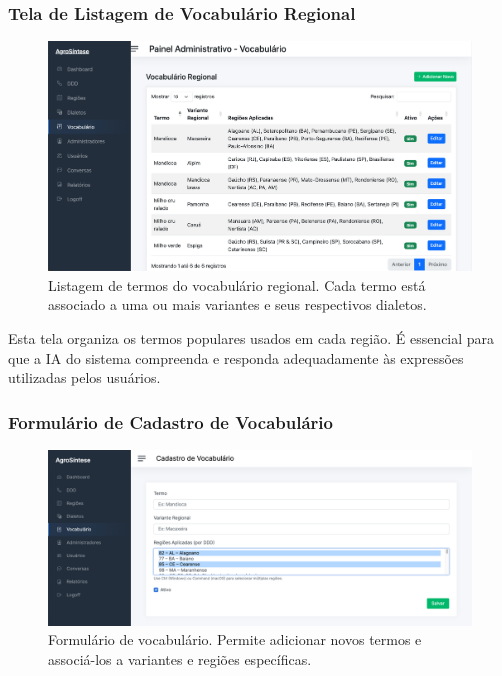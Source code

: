 \subsubsection*{Tela de Listagem de Vocabulário Regional}

\begin{figure}[H]
	\centering
	\includegraphics[width=0.95\linewidth]{images/adm-vocabulario-lista.png}
	\caption{Listagem de termos do vocabulário regional. Cada termo está associado a uma ou mais variantes e seus respectivos dialetos.}
\end{figure}

Esta tela organiza os termos populares usados em cada região. É essencial para que a IA do sistema compreenda e responda adequadamente às expressões utilizadas pelos usuários.

\subsubsection*{Formulário de Cadastro de Vocabulário}

\begin{figure}[H]
	\centering
	\includegraphics[width=0.95\linewidth]{images/adm-vocabulario-form.png}
	\caption{Formulário de vocabulário. Permite adicionar novos termos e associá-los a variantes e regiões específicas.}
\end{figure}

